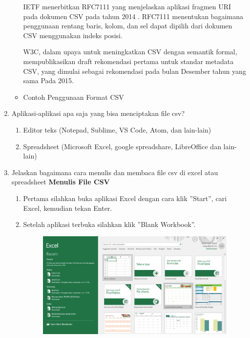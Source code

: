 \begin{enumerate}
\begin{itemize}
        \hspace*{1cm}IETF menerbitkan RFC7111 yang menjelaskan aplikasi fragmen URI pada dokumen CSV  pada tahun 2014 . RFC7111 menentukan bagaimana penggunaan rentang baris, kolom, dan sel dapat dipilih dari dokumen CSV menggunakan indeks posisi.
       
        \hspace*{1cm}W3C, dalam upaya untuk meningkatkan CSV dengan semantik formal, mempublikasikan draft rekomendasi pertama untuk standar metadata CSV, yang dimulai sebagai rekomendasi pada bulan Desember tahun yang sama Pada 2015.
       
	\item Contoh Penggunaan Format CSV
	
	\end{itemize}
	
    \item Aplikasi-aplikasi apa saja yang bisa menciptakan file csv?
	\begin{enumerate}
		\item Editor teks (Notepad, Sublime, VS Code, Atom, dan lain-lain)
		\item Spreadsheet (Microsoft Excel, google spreadshare, LibreOffice dan lain-lain)
	\end{enumerate}
		
	\item Jelaskan bagaimana cara menulis dan membaca file csv di excel atau spreadsheet	
	\textbf{Menulis File CSV}
	\begin{enumerate}
		\item Pertama silahkan buka aplikasi Excel dengan cara klik ''Start'', cari Excel, kemudian tekan Enter.
		
	
		\item Setelah aplikasi terbuka silahkan klik ''Blank Workbook''.
		
		\begin{figure}[!htbp]
			\includegraphics[width=10cm]{figures/a1.PNG}
			\centering
		\end{figure}
		\newpage
		

\end{enumerate}
\end{enumerate}
